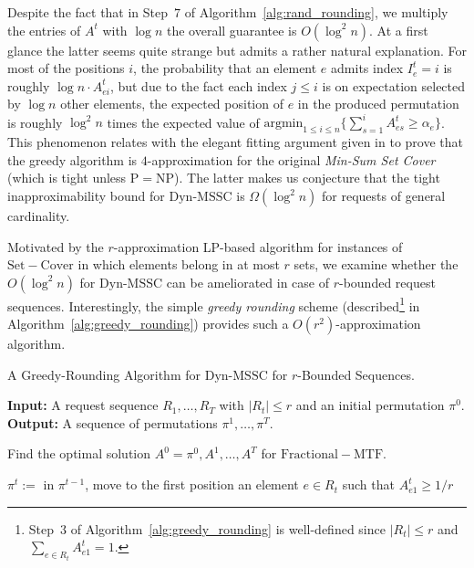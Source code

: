 \documentclass[a4paper,UKenglish,cleveref,autoref, thm-restate]{lipics-v2019}
\def\DSSC{\mathrm{Dyn}\text{-}\mathrm{MSSC}}
\begin{document}
\noindent Despite the fact that in Step~$7$ of Algorithm~\ref{alg:rand_rounding}, we multiply the entries of $A^t$ with $\log n$ the overall guarantee is $O(\log^2 n)$. At a first glance the latter seems quite strange but admits a rather natural explanation. For most of the positions $i$, the probability that an element $e$ admits index $I_e^t = i$ is roughly $\log n \cdot A_{ei}^t$, but due to the fact each index $j \leq i$ is on expectation  selected by $\log n$ other elements, the expected position of $e$ in the produced permutation is roughly $ \log^2 n$ times the expected value of
$\mathrm{argmin}_{1\leq i \leq n} \{ \sum_{s=1}^i A_{es}^t \geq \alpha_e\}$. This phenomenon relates with the elegant fitting argument given in \cite{FLT04} to prove that the greedy algorithm is $4$-approximation for the original \textit{Min-Sum Set Cover} (which is tight unless $\mathrm{P}= \mathrm{NP}$). %
The latter makes us conjecture that the tight inapproximability bound for $\DSSC$ is $\Omega(\log^2 n)$ for requests of general cardinality. 

Motivated by the $r$-approximation LP-based algorithm for instances of 
$\mathrm{Set-Cover}$ in which elements belong in at most $r$ sets, we examine whether the $O(\log^2 n)$ for $\DSSC$
can be ameliorated in case of $r$-bounded request sequences. Interestingly, the simple \textit{greedy rounding} scheme (described\footnote{Step~$3$ of Algorithm~\ref{alg:greedy_rounding} is well-defined since $|R_t| \leq r$ and $\sum_{e \in R_t}A_{e1}^t = 1$.} in Algorithm~\ref{alg:greedy_rounding}) provides such a $O(r^2)$-approximation algorithm.
\begin{algorithm}[H]
  \caption{A Greedy-Rounding Algorithm for $\DSSC$ for $r$-Bounded Sequences.}\label{alg:greedy_rounding}
  \textbf{Input:} A request sequence $R_1,\ldots,R_T$ with $|R_t| \leq r$ and an initial permutation $\pi^0$.\\
  \textbf{Output:} A sequence of permutations $\pi^1,\ldots,\pi^T$.

 \begin{algorithmic}[1]
 \STATE Find the optimal solution $A^0=\pi^0,A^1,\ldots,A^T$ for $\mathrm{Fractional-MTF}$. 

 
              
        \STATE $\pi^t:=$ in $\pi^{t-1}$, move to the first position an element $e \in R_t$
        such that $A_{e1}^t \geq 1/r$
\ENDFOR
  \end{algorithmic}
\end{algorithm}
\end{document}
